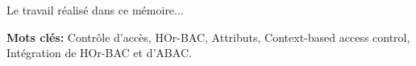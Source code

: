 \let\oldprintchaptertitle=\printchaptertitle
\renewcommand{\printchaptertitle}[1]{%
	\vspace*{-75pt}
	\oldprintchaptertitle{#1}
}%
\let\printchaptertitle=\oldprintchaptertitle
Le travail réalisé dans ce mémoire...

\vspace{1cm}
\noindent\textbf{Mots clés:} Contrôle d'accès, HOr-BAC, Attributs, Context-based access control, Intégration de HOr-BAC et d'ABAC.

\myCleanStarChapterEnd
